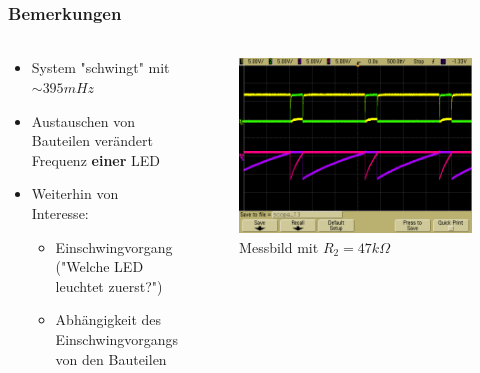 \begin{frame}
    \frametitle{Bemerkungen}
    \framesubtitle{}
    \begin{columns}[c]
     \begin{block}{}
         \begin{itemize}
             \item System "schwingt" mit $\sim 395mHz$  
             \item Austauschen von Bauteilen verändert Frequenz \textbf{einer} LED
             \item Weiterhin von Interesse:
             \begin{itemize}
                 \item Einschwingvorgang ("Welche LED leuchtet zuerst?")
                 \item Abhängigkeit des Einschwingvorgangs von den Bauteilen
             \end{itemize}
         \end{itemize}
     \end{block}
     \begin{figure}[H]
     \begin{center}
             \includegraphics[scale=0.15]{./img/oszi/Aufgabe232_47kOhm.png}
     \end{center}
     \caption{Messbild mit $R_2 = 47k\Omega$}
     \end{figure}
     
    \end{columns}
\end{frame}

